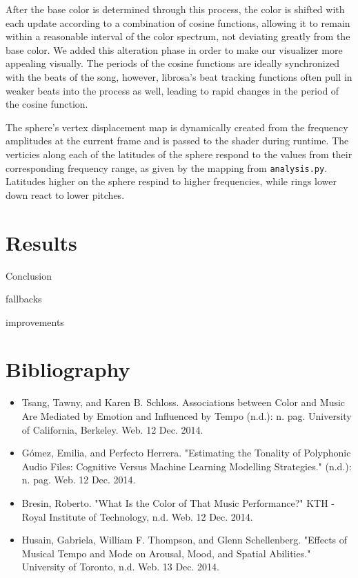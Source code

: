 \documentclass{article}
\newcommand{\code}{\texttt}
\begin{document}
After the base color is determined through this process, the color is shifted with each update according to a combination of cosine functions, allowing it to remain within a reasonable interval of the color spectrum, not deviating greatly from the base color. We added this alteration phase in order to make our visualizer more appealing visually. The periods of the cosine functions are ideally synchronized with the beats of the song, however, librosa's beat tracking functions often pull in weaker beats into the process as well, leading to rapid changes in the period of the cosine function.


The sphere's vertex displacement map is dynamically created from the frequency amplitudes at the current frame and is passed to the shader during runtime. The verticies along each of the latitudes of the sphere respond to the values from their corresponding frequency range, as given by the mapping from \code{analysis.py}. Latitudes higher on the sphere respind to higher frequencies, while rings lower down react to lower pitches.

\section{Results}

Conclusion

fallbacks

improvements

\section{Bibliography}

\begin{itemize}
    \item Tsang, Tawny, and Karen B. Schloss. Associations between Color and Music Are Mediated by Emotion and Influenced by Tempo (n.d.): n. pag. University of California, Berkeley. Web. 12 Dec. 2014.
    \item Gómez, Emilia, and Perfecto Herrera. "Estimating the Tonality of Polyphonic Audio Files: Cognitive Versus Machine Learning Modelling Strategies." (n.d.): n. pag. Web. 12 Dec. 2014.
    \item Bresin, Roberto. "What Is the Color of That Music Performance?" KTH - Royal Institute of Technology, n.d. Web. 12 Dec. 2014.
    \item Husain, Gabriela, William F. Thompson, and Glenn Schellenberg. "Effects of Musical Tempo and Mode on Arousal, Mood, and Spatial Abilities." University of Toronto, n.d. Web. 13 Dec. 2014.
\end{itemize}
\end{document}
